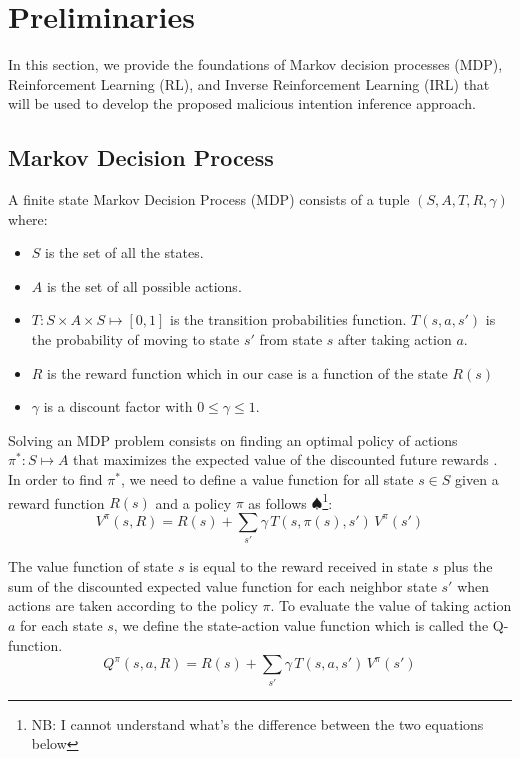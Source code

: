 \documentclass[letterpaper, 10 pt, conference]{ieeeconf}  %
\newcommand\NB[1]{$\spadesuit$\footnote{NB: #1}}
\begin{document}
\section{Preliminaries}\label{sec:Preliminaries}
In this section, we provide the foundations of Markov decision processes (MDP), Reinforcement Learning (RL), and Inverse Reinforcement Learning (IRL) that will be used to develop the proposed malicious intention inference approach.
\subsection{Markov Decision Process}
A finite state Markov Decision Process (MDP) \cite{puterman2014markov} consists of a tuple $(S,A,T,R,\gamma)$ where:
\begin{itemize}
    \item $S$ is the set of all the states.
    \item $A$ is the set of all possible actions.
    \item $T : S\times A\times S \mapsto [0,1]$ is the transition probabilities function. $T(s,a,s')$ is the probability of moving to state $s'$ from state $s$ after taking action $a$.
    \item $R$ is the reward function which in our case is a function of the state $R(s)$
    \item $\gamma$ is a discount factor with $0\leq\gamma\leq1$.
\end{itemize}
Solving an MDP problem consists on finding an optimal policy of actions $\pi^*: S \mapsto A$ that maximizes the expected value of the discounted future rewards \cite{bezzo2016stochastic}.
In order to find $\pi^*$, we need to define a value function for all state $s \in S$ given a reward function $R(s)$ and a policy $\pi$ as follows \NB{I cannot understand what's the difference between the two equations below}:
\begin{equation}
V^\pi(s,R) = R(s) + \sum_{s'}\gamma\,T(s,\pi(s),s')\,V^\pi(s') 
\end{equation}

The value function of state $s$ is equal to the reward received in state $s$ plus the sum of the discounted expected value function for each neighbor state $s'$ when actions are taken according to the policy $\pi$.
To evaluate the value of taking action $a$ for each state $s$, we define the state-action value function which is called the Q-function.
\begin{equation}
Q^\pi(s,a,R) = R(s) + \sum_{s'} \gamma\,T(s,a,s')\,V^\pi(s')
\end{equation}
\end{document}
